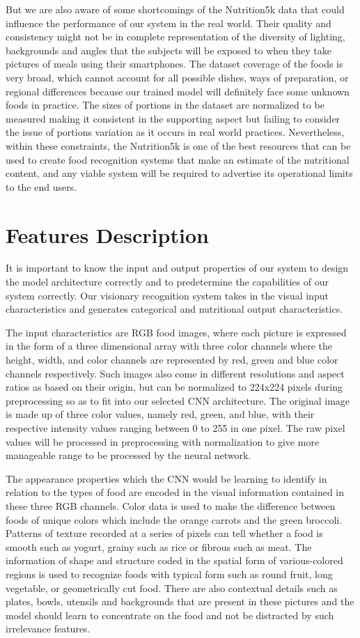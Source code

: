 \documentclass[12pt, openany]{report}
\begin{document}
But we are also aware of some shortcomings of the Nutrition5k data that could influence the performance of our system in the real world. Their quality and consistency might not be in complete representation of the diversity of lighting, backgrounds and angles that the subjects will be exposed to when they take pictures of meals using their smartphones. The dataset coverage of the foods is very broad, which cannot account for all possible dishes, ways of preparation, or regional differences because our trained model will definitely face some unknown foods in practice. The sizes of portions in the dataset are normalized to be measured making it consistent in the supporting aspect but failing to consider the issue of portions variation as it occurs in real world practices. Nevertheless, within these constraints, the Nutrition5k is one of the best resources that can be used to create food recognition systems that make an estimate of the nutritional content, and any viable system will be required to advertise its operational limits to the end users.\pagebreak


\section{Features Description}
It is important to know the input and output properties of our system to design the model architecture correctly and to predetermine the capabilities of our system correctly. Our visionary recognition system takes in the visual input characteristics and generates categorical and nutritional output characteristics.

The input characteristics are RGB food images, where each picture is expressed in the form of a three dimensional array with three color channels where the height, width, and color channels are represented by red, green and blue color channels respectively. Such images also come in different resolutions and aspect ratios as based on their origin, but can be normalized to 224x224 pixels during preprocessing so as to fit into our selected CNN architecture. The original image is made up of three color values, namely red, green, and blue, with their respective intensity values ranging between 0 to 255 in one pixel. The raw pixel values will be processed in preprocessing with normalization to give more manageable range to be processed by the neural network.

The appearance properties which the CNN would be learning to identify in relation to the types of food are encoded in the visual information contained in these three RGB channels. Color data is used to make the difference between foods of unique colors which include the orange carrots and the green broccoli. Patterns of texture recorded at a series of pixels can tell whether a food is smooth such as yogurt, grainy such as rice or fibrous such as meat. The information of shape and structure coded in the spatial form of various-colored regions is used to recognize foods with typical form such as round fruit, long vegetable, or geometrically cut food. There are also contextual details such as plates, bowls, utensils and backgrounds that are present in these pictures and the model should learn to concentrate on the food and not be distracted by such irrelevance features.
\end{document}
